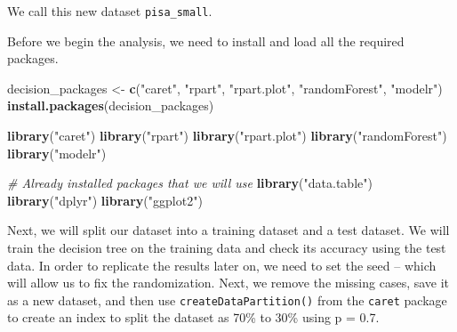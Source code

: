 \documentclass[]{book}
\newenvironment{Shaded}{\begin{snugshade}}{\end{snugshade}}
\newcommand{\CommentTok}[1]{\textcolor[rgb]{0.56,0.35,0.01}{\textit{#1}}}
\newcommand{\DataTypeTok}[1]{\textcolor[rgb]{0.13,0.29,0.53}{#1}}
\newcommand{\KeywordTok}[1]{\textcolor[rgb]{0.13,0.29,0.53}{\textbf{#1}}}
\newcommand{\NormalTok}[1]{#1}
\newcommand{\OperatorTok}[1]{\textcolor[rgb]{0.81,0.36,0.00}{\textbf{#1}}}
\newcommand{\StringTok}[1]{\textcolor[rgb]{0.31,0.60,0.02}{#1}}
\begin{document}
We call this new dataset \texttt{pisa\_small}.

\begin{Shaded}
\end{Shaded}

Before we begin the analysis, we need to install and load all the required packages.

\begin{Shaded}
\begin{Highlighting}[]
\NormalTok{decision_packages <-}\StringTok{ }\KeywordTok{c}\NormalTok{(}\StringTok{"caret"}\NormalTok{, }\StringTok{"rpart"}\NormalTok{, }\StringTok{"rpart.plot"}\NormalTok{, }\StringTok{"randomForest"}\NormalTok{, }\StringTok{"modelr"}\NormalTok{)}
\KeywordTok{install.packages}\NormalTok{(decision_packages)}

\KeywordTok{library}\NormalTok{(}\StringTok{"caret"}\NormalTok{)}
\KeywordTok{library}\NormalTok{(}\StringTok{"rpart"}\NormalTok{)}
\KeywordTok{library}\NormalTok{(}\StringTok{"rpart.plot"}\NormalTok{)}
\KeywordTok{library}\NormalTok{(}\StringTok{"randomForest"}\NormalTok{)}
\KeywordTok{library}\NormalTok{(}\StringTok{"modelr"}\NormalTok{)}

\CommentTok{# Already installed packages that we will use}
\KeywordTok{library}\NormalTok{(}\StringTok{"data.table"}\NormalTok{)}
\KeywordTok{library}\NormalTok{(}\StringTok{"dplyr"}\NormalTok{)}
\KeywordTok{library}\NormalTok{(}\StringTok{"ggplot2"}\NormalTok{)}
\end{Highlighting}
\end{Shaded}

Next, we will split our dataset into a training dataset and a test dataset. We will train the decision tree on the training data and check its accuracy using the test data. In order to replicate the results later on, we need to set the seed -- which will allow us to fix the randomization. Next, we remove the missing cases, save it as a new dataset, and then use \texttt{createDataPartition()} from the \texttt{caret} package to create an index to split the dataset as 70\% to 30\% using p = 0.7.
\end{document}
